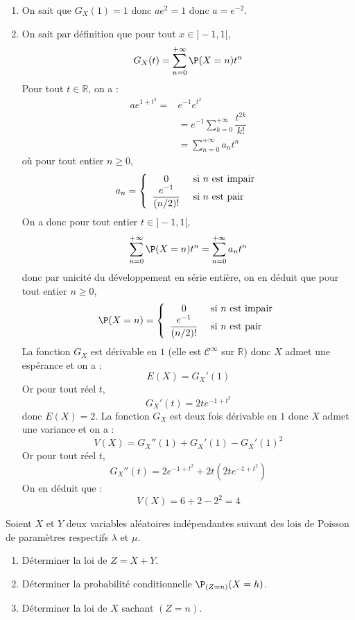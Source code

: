 \documentclass[a4paper,10pt]{report}
\begin{document}
\corr 

\begin{enumerate}
\item On sait que $G_X(1)=1$ donc $ae^2=1$ donc $a= e^{-2}$.
\item On sait par définition que pour tout $x \in ]-1,1[$,
$$ G_X(t) = \sum_{n=0}^{+ \infty}  \P(X=n) t^n $$
Pour tout $t \in \mathbb{R}$, on a :
\begin{align*}
ae^{1+t^2} = & e^{-1} e^{t^2} \\
& = e^{-1} \sum_{k=0}^{+ \infty} \dfrac{t^{2k}}{k!} \\
& = \sum_{n=0}^{+ \infty} a_n t^n
\end{align*}
où pour tout entier $n \geq 0$,
$$ a_n = \left\lbrace \begin{array}{cl}
0 & \hbox{ si } n \hbox{ est impair} \\
\dfrac{e^{-1}}{(n/2)!} & \hbox{ si } n \hbox{ est pair} \\
\end{array}\right.$$
On a donc pour tout entier $t \in ]-1,1[$,
$$ \sum_{n=0}^{+ \infty}  \P(X=n) t^n= \sum_{n=0}^{+ \infty} a_n t^n $$
donc par unicité du développement en série entière, on en déduit que pour tout entier $n \geq 0$,
$$  \P(X=n) = \left\lbrace \begin{array}{cl}
0 & \hbox{ si } n \hbox{ est impair} \\
\dfrac{e^{-1}}{(n/2)!} & \hbox{ si } n \hbox{ est pair} \\
\end{array}\right.$$
La fonction $G_X$ est dérivable en $1$ (elle est $\mathcal{C}^{\infty}$ sur $\mathbb{R}$) donc $X$ admet une espérance et on a :
$$ E(X)= G_X'(1)$$
Or pour tout réel $t$,
$$ G_X'(t) = 2t e^{-1+t^2}$$
donc $E(X)= 2$. La fonction $G_X$ est deux fois dérivable en $1$ donc $X$ admet une variance et on a :
$$ V(X) = G_X''(1)+G_X'(1)-G_X'(1)^2$$
Or pour tout réel $t$,
$$ G_X''(t) = 2e^{-1+t^2} + 2t (2t e^{-1+t^2})$$
On en déduit que :
$$ V(X) = 6+ 2-2^2=4$$
\end{enumerate}


\begin{Exercice}{}
Soient $X$ et $Y$ deux variables aléatoires indépendantes suivant des lois de Poisson de paramètres respectifs $\lambda$ et $\mu$.
\begin{enumerate}
\item Déterminer la loi de $Z=X+Y$.
\item Déterminer la probabilité conditionnelle $\P_{(Z=n)}(X=h)$.
\item Déterminer la loi de $X$ sachant $(Z=n)$.
\end{enumerate}
\end{Exercice}
\end{document}
